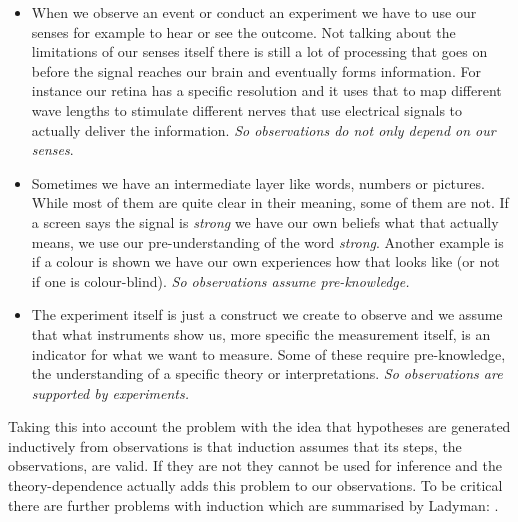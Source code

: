 \documentclass[11pt]{scrartcl}
\begin{document}
\begin{itemize}
  \item When we observe an event or conduct an experiment we have to use our senses for example to hear or see the outcome. Not talking about the limitations of our senses itself there is still a lot of processing that goes on before the signal reaches our brain and eventually forms information. For instance our retina has a specific resolution and it uses that to map different wave lengths to stimulate different nerves that use electrical signals to actually deliver the information. \textit{So observations do not only depend on our senses}.
  \item Sometimes we have an intermediate layer like words, numbers or pictures. While most of them are quite clear in their meaning, some of them are not. If a screen says the signal is \textit{strong} we have our own beliefs what that actually means, we use our pre-understanding of the word \textit{strong}. Another example is if a colour is shown we have our own experiences how that looks like (or not if one is colour-blind). \textit{So observations assume pre-knowledge.}
  \item The experiment itself is just a construct we create to observe and we assume that what instruments show us, more specific the measurement itself, is an indicator for what we want to measure. Some of these require pre-knowledge, the understanding of a specific theory or interpretations. \textit{So observations are supported by experiments.}
  \end{itemize}
  
 Taking this into account the problem with the idea that hypotheses are generated inductively from observations is that induction assumes that its steps, the observations, are valid. If they are not they cannot be used for inference and the theory-dependence actually adds this problem to our observations. To be critical there are further problems with induction which are summarised by Ladyman:  \cite[p. 40]{ladyman}.
 
\end{document}
